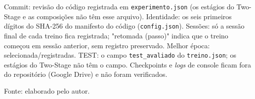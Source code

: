 \vspace{-\baselineskip}
\nopagebreak\noindent\begin{minipage}{\linewidth}
{\footnotesize Commit: revisão do código registrada em \texttt{experimento.json} (os estágios do Two-Stage e as composições não têm esse arquivo). Identidade: os seis primeiros dígitos do SHA-256 do manifesto do código (\texttt{config.json}). Sessões: só a sessão final de cada treino fica registrada; "retomada (passo)" indica que o treino começou em sessão anterior, sem registro preservado. Melhor época: selecionada/registradas. TEST: o campo \texttt{test\_avaliado} do \texttt{treino.json}; os estágios do Two-Stage não têm o campo. Checkpoints e \emph{logs} de console ficam fora do repositório (Google Drive) e não foram verificados.\par}\vspace{4pt}
{\footnotesize Fonte: elaborado pelo autor.}
\end{minipage}\par
\endgroup
